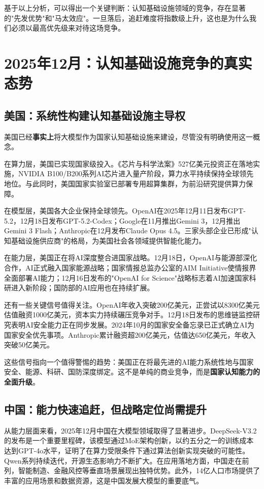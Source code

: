基于以上分析，可以得出一个关键判断：认知基础设施领域的竞争，存在显著的"先发优势"和"马太效应"。一旦落后，追赶难度将指数级上升，这也是为什么我们必须以最高优先级来对待这场竞争。

\section{2025年12月：认知基础设施竞争的真实态势}

\subsection{美国：系统性构建认知基础设施主导权}

美国已经\textbf{事实上}将大模型作为国家认知基础设施来建设，尽管没有明确使用这一概念。

在算力层，美国已实现国家级投入。《芯片与科学法案》527亿美元投资正在落地实施，NVIDIA B100/B200系列AI芯片进入量产阶段，算力水平持续保持全球领先地位。与此同时，美国国家实验室已部署专用超算集群，为前沿研究提供算力保障。

在模型层，美国各大企业保持全球领先。OpenAI在2025年12月11日发布GPT-5.2，12月18日发布GPT-5.2-Codex；Google在11月推出Gemini 3，12月推出Gemini 3 Flash；Anthropic在12月发布Claude Opus 4.5。三家头部企业已形成"认知基础设施供应商"的格局，为美国社会各领域提供智能化能力。

在能力层，美国正在将AI深度整合进国家战略。12月18日，OpenAI与能源部深化合作，AI正式融入国家能源战略；国家情报总监办公室的AIM Initiative使情报界全面部署AI能力；12月16日发布的"OpenAI for Science"战略标志着AI加速国家科研进入新阶段；国防部的AI应用也在持续扩展。

还有一些关键信号值得关注。OpenAI年收入突破200亿美元，正尝试以8300亿美元估值融资1000亿美元，资本实力持续碾压竞争对手。12月18日发布的思维链监控研究表明AI安全能力正在同步发展。2024年10月的国家安全备忘录已正式确立AI为国家安全优先事项。Anthropic累计融资超200亿美元，估值达650亿美元，年收入突破50亿美元。

这些信号指向一个值得警惕的趋势：美国正在将最先进的AI能力系统性地与国家安全、能源、科研、国防深度绑定。这不是单纯的商业竞争，而是\textbf{国家认知能力的全面升级}。

\subsection{中国：能力快速追赶，但战略定位尚需提升}

从能力层面来看，2025年12月中国在大模型领域取得了显著进步。DeepSeek-V3.2的发布是一个重要里程碑，该模型通过MoE架构创新，以约五分之一的训练成本达到GPT-4o水平，证明了在算力受限条件下通过算法创新实现突破的可能性。Qwen系列持续迭代，开源生态影响力不断扩大。在应用落地方面，中国走在前列，智能制造、金融风控等垂直场景展现出独特优势。此外，14亿人口市场提供了丰富的应用场景和数据资源，这是中国发展大模型的重要底气。


